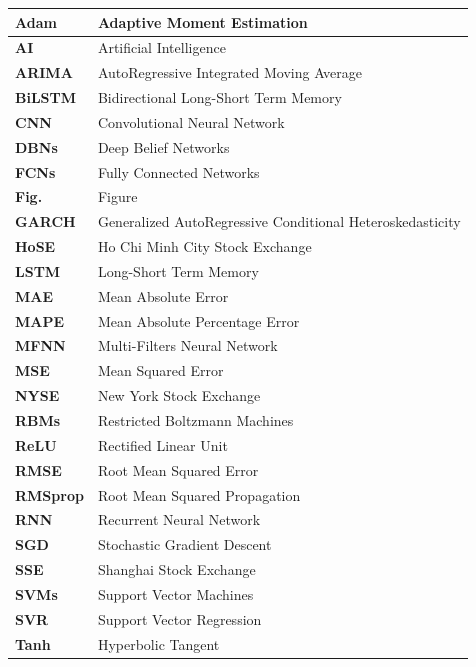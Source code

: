 \documentclass[a4paper]{article}
\begin{document}
\begin{spacing}{1.5}
    \begin{tabular}{|l|l|}
    \hline
        \textbf{Adam} & Adaptive Moment Estimation \\ \hline
        \textbf{AI} & Artificial Intelligence \\ \hline
        \textbf{ARIMA} & AutoRegressive Integrated Moving Average \\ \hline
        \textbf{BiLSTM} & Bidirectional Long-Short Term Memory \\ \hline
        \textbf{CNN} & Convolutional Neural Network \\ \hline
        \textbf{DBNs} & Deep Belief Networks \\ \hline
        \textbf{FCNs} & Fully Connected Networks \\ \hline
        \textbf{Fig.} & Figure \\ \hline
        \textbf{GARCH} & Generalized AutoRegressive Conditional Heteroskedasticity \\ \hline
        \textbf{HoSE} & Ho Chi Minh City Stock Exchange \\ \hline
        \textbf{LSTM} & Long-Short Term Memory \\ \hline
        \textbf{MAE} & Mean Absolute Error \\ \hline
        \textbf{MAPE} & Mean Absolute Percentage Error \\ \hline
        \textbf{MFNN} & Multi-Filters Neural Network \\ \hline
        \textbf{MSE} & Mean Squared Error \\ \hline
        \textbf{NYSE} & New York Stock Exchange \\ \hline
        \textbf{RBMs} & Restricted Boltzmann Machines \\ \hline
        \textbf{ReLU} & Rectified Linear Unit \\ \hline
        \textbf{RMSE} & Root Mean Squared Error \\ \hline
        \textbf{RMSprop} & Root Mean Squared Propagation \\ \hline
        \textbf{RNN} & Recurrent Neural Network \\ \hline
        \textbf{SGD} & Stochastic Gradient Descent \\ \hline
        \textbf{SSE} & Shanghai Stock Exchange \\ \hline
        \textbf{SVMs} & Support Vector Machines \\ \hline
        \textbf{SVR} & Support Vector Regression \\ \hline
        \textbf{Tanh} & Hyperbolic Tangent \\ \hline
    \end{tabular}
\end{spacing}
\end{document}
